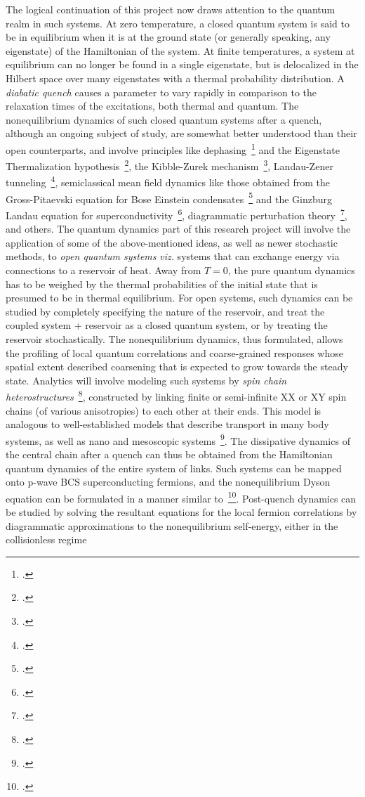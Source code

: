\documentclass[a4paper,11pt]{article}
\begin{document}
The logical continuation of this project now draws attention to the quantum realm in such systems. At zero temperature, a closed quantum system is said to be in equilibrium when it is at the ground state (or generally speaking, any eigenstate) of the Hamiltonian of the system. At finite temperatures, a system at equilibrium can no longer be found in a single eigenstate, but is delocalized in the Hilbert space over many eigenstates with a thermal probability distribution. A \textit{diabatic quench} causes a  {parameter} to vary rapidly in comparison to the relaxation times of the excitations, both thermal and quantum. The nonequilibrium dynamics of such closed quantum systems after a quench, although an ongoing subject of study,  {are somewhat better understood than their open counterparts}, and involve principles like dephasing~\footcite{thermalization} 
and the Eigenstate Thermalization hypothesis~\footcites{thermalization}{krishrev}, the Kibble-Zurek mechanism~\footcite{bikashbabu}, Landau-Zener tunneling~\footcite{bikashbabu}, semiclassical mean field dynamics like those obtained from the Gross-Pitaevski equation for Bose Einstein condensates~\footcite{colrev} and the Ginzburg Landau equation for superconductivity~\footcite{rammer}, diagrammatic perturbation theory~\footcite{gorkov, volkov}, and others. The quantum dynamics part of this research project will involve the application of some of the above-mentioned ideas, as well as newer stochastic methods, to \textit{open quantum systems} \textit{viz.} systems that can exchange energy via connections to a reservoir of heat. Away from $T=0$, the pure quantum dynamics has to be weighed by the thermal probabilities of the initial state that is presumed to be in thermal equilibrium. For open systems, such dynamics can be studied by completely specifying the nature of the reservoir, and treat the coupled system 
+ 
reservoir as a closed 
quantum system, or by treating the reservoir stochastically. The nonequilibrium dynamics, thus formulated, allows the profiling of local quantum correlations and coarse-grained responses whose 
spatial extent described coarsening that is expected to grow towards the steady state. Analytics will involve modeling such systems by \textit{spin chain heterostructures}~\footcite{arrachea},  constructed by linking finite or semi-infinite XX or XY spin chains (of various anisotropies) to each other at their ends. This model is analogous to well-established models that describe transport in many body systems, as well as nano and mesoscopic systems~\footcite{arrachea,openspin, imry}. The dissipative dynamics of the central chain after a quench can thus be obtained from the Hamiltonian quantum dynamics of the entire system of links. Such systems can be mapped onto p-wave BCS superconducting fermions, and the nonequilibrium Dyson equation can be formulated in a manner similar to~\footcite{gorkov, volkov}. Post-quench dynamics can be studied by solving the resultant equations for the local fermion correlations by diagrammatic approximations to the nonequilibrium self-energy, either in the collisionless regime~\
\end{document}
